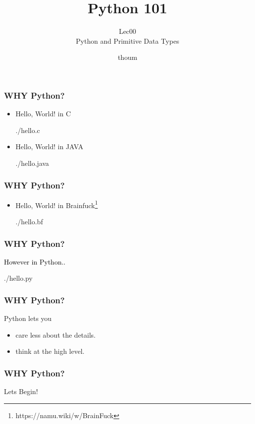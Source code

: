 \documentclass{beamer}
\title{Python 101}
\subtitle{Lec00 \\ Python and Primitive Data Types}
\author{thoum}
\begin{document}
\frame{\titlepage}

\begin{frame}
\frametitle{WHY Python?}
\begin{itemize}
    \item
    Hello, World! in C
    \begin{lstinputlisting}
      {./hello.c}
    \end{lstinputlisting}
    \item
    Hello, World! in JAVA
    \begin{lstinputlisting}
      {./hello.java}
    \end{lstinputlisting}
\end{itemize}
\end{frame}

\begin{frame}
\frametitle{WHY Python?}
\begin{itemize}
    \item
      Hello, World! in
      Brainfuck\footnote{\footnotesize{https://namu.wiki/w/BrainFuck}}
    \begin{lstinputlisting}
      {./hello.bf}
    \end{lstinputlisting}
\end{itemize}
\end{frame}

\begin{frame}
\frametitle{WHY Python?}
  \textcolor{black}{\LARGE{However in Python..}}
\end{frame}

\begin{frame}
    \begin{lstinputlisting}
      {./hello.py}
    \end{lstinputlisting}
\end{frame}

\begin{frame}
\frametitle{WHY Python?}
  {\Large{Python lets you}}
  \begin{itemize}
    \item care less about the details.
    \item think at the high level.
  \end{itemize}
\end{frame}

\begin{frame}
\frametitle{WHY Python?}
  \begin{center}
  {\Large{Lets Begin!}}
  \end{center}

\end{frame}
\end{document}
